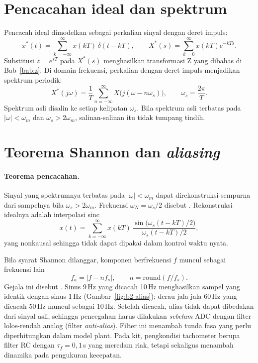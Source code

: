 \section{Pencacahan ideal dan spektrum}
Pencacah ideal dimodelkan sebagai perkalian sinyal dengan deret impuls:
\begin{equation}
	x^*(t) = \sum_{k=-\infty}^{\infty} x(kT)\,\delta(t-kT),\qquad X^*(s) = \sum_{k=0}^{\infty}x(kT)e^{-kTs}.
\end{equation}
Substitusi $z = e^{sT}$ pada $X^*(s)$ menghasilkan transformasi Z yang dibahas di Bab~\ref{bab:z}. Di domain frekuensi, perkalian dengan deret impuls menjadikan spektrum periodik:
\begin{equation}
	X^*(j\omega) = \frac{1}{T}\sum_{n=-\infty}^{\infty}X\big(j(\omega - n\omega_s)\big),\qquad \omega_s = \frac{2\pi}{T}.
\end{equation}
Spektrum asli disalin ke setiap kelipatan $\omega_s$. Bila spektrum asli terbatas pada $|\omega| < \omega_m$ dan $\omega_s > 2\omega_m$, salinan-salinan itu tidak tumpang tindih.

\section{Teorema Shannon dan \textit{aliasing}}
\paragraph{Teorema pencacahan.} Sinyal yang spektrumnya terbatas pada $|\omega| < \omega_m$ dapat direkonstruksi sempurna dari sampelnya bila $\omega_s > 2\omega_m$. Frekuensi $\omega_N = \omega_s/2$ disebut . Rekonstruksi idealnya adalah interpolasi sinc
\begin{equation}
	x(t) = \sum_{k=-\infty}^{\infty}x(kT)\,\frac{\sin\big(\omega_s(t-kT)/2\big)}{\omega_s(t-kT)/2},
\end{equation}
yang nonkausal sehingga tidak dapat dipakai dalam kontrol waktu nyata.

Bila syarat Shannon dilanggar, komponen berfrekuensi $f$ muncul sebagai frekuensi lain
\begin{equation}
	f_a = |f - nf_s|,\qquad n = \text{round}(f/f_s).
\end{equation}
Gejala ini disebut . Sinus 9\,Hz yang dicacah 10\,Hz menghasilkan sampel yang identik dengan sinus 1\,Hz (Gambar~\ref{fig:b2-alias}); derau jala-jala 60\,Hz yang dicacah 50\,Hz muncul sebagai 10\,Hz. Setelah dicacah, alias tidak dapat dibedakan dari sinyal asli, sehingga pencegahan harus dilakukan \emph{sebelum} ADC dengan filter lolos-rendah analog (filter \textit{anti-alias}). Filter ini menambah tunda fasa yang perlu diperhitungkan dalam model plant. Pada kit, pengkondisi tachometer berupa filter RC dengan $\tau_f = 0{,}1$\,s yang meredam riak, tetapi sekaligus menambah dinamika pada pengukuran kecepatan.

